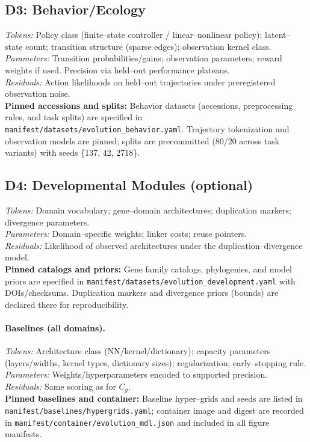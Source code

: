 \documentclass[11pt,a4paper]{article}
\begin{document}
\subsection*{D3: Behavior/Ecology}
\emph{Tokens:} Policy class (finite–state controller / linear–nonlinear policy); latent–state count; transition structure (sparse edges); observation kernel class.\\
\emph{Parameters:} Transition probabilities/gains; observation parameters; reward weights if used. Precision via held–out performance plateaus.\\
\emph{Residuals:} Action likelihoods on held–out trajectories under preregistered observation noise.\\
\textbf{Pinned accessions and splits:} Behavior datasets (accessions, preprocessing rules, and task splits) are specified in \texttt{manifest/datasets/evolution\_behavior.yaml}. Trajectory tokenization and observation models are pinned; splits are precommitted (80/20 across task variants) with seeds \{137, 42, 2718\}.

\subsection*{D4: Developmental Modules (optional)}
\emph{Tokens:} Domain vocabulary; gene–domain architectures; duplication markers; divergence parameters.\\
\emph{Parameters:} Domain–specific weights; linker costs; reuse pointers.\\
\emph{Residuals:} Likelihood of observed architectures under the duplication–divergence model.\\
\textbf{Pinned catalogs and priors:} Gene family catalogs, phylogenies, and model priors are specified in \texttt{manifest/datasets/evolution\_development.yaml} with DOIs/checksums. Duplication markers and divergence priors (bounds) are declared there for reproducibility.

\paragraph{Baselines (all domains).}
\emph{Tokens:} Architecture class (NN/kernel/dictionary); capacity parameters (layers/widths, kernel types, dictionary sizes); regularization; early–stopping rule.\\
\emph{Parameters:} Weights/hyperparameters encoded to supported precision.\\
\emph{Residuals:} Same scoring as for $C_g$.\\
\textbf{Pinned baselines and container:} Baseline hyper–grids and seeds are listed in \texttt{manifest/baselines/hypergrids.yaml}; container image and digest are recorded in \texttt{manifest/container/evolution\_mdl.json} and included in all figure manifests.
\end{document}
